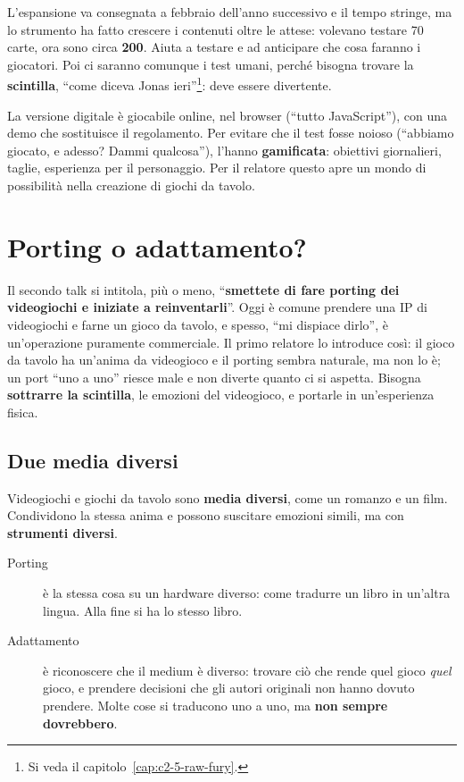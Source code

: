 L'espansione va consegnata a febbraio dell'anno successivo e il tempo stringe, ma
lo strumento ha fatto crescere i contenuti oltre le attese: volevano testare 70
carte, ora sono circa \textbf{200}. Aiuta a testare e ad anticipare che cosa faranno
i giocatori. Poi ci saranno comunque i test umani, perché bisogna trovare la
\textbf{scintilla}, ``come diceva Jonas ieri''\footnote{Si veda il
capitolo~\ref{cap:c2-5-raw-fury}.}: deve essere divertente.

La versione digitale è giocabile online, nel browser (``tutto JavaScript''), con una
demo che sostituisce il regolamento. Per evitare che il test fosse noioso
(``abbiamo giocato, e adesso? Dammi qualcosa''), l'hanno \textbf{gamificata}:
obiettivi giornalieri, taglie, esperienza per il personaggio. Per il relatore questo
apre un mondo di possibilità nella creazione di giochi da tavolo.

\section{Porting o adattamento?}
\label{sec:c3-5-porting}

Il secondo talk si intitola, più o meno, ``\textbf{smettete di fare porting dei
videogiochi e iniziate a reinventarli}''. Oggi è comune prendere una IP di
videogiochi e farne un gioco da tavolo, e spesso, ``mi dispiace dirlo'', è
un'operazione puramente commerciale. Il primo relatore lo introduce così: il gioco
da tavolo ha un'anima da videogioco e il porting sembra naturale, ma non lo è; un
port ``uno a uno'' riesce male e non diverte quanto ci si aspetta. Bisogna
\textbf{sottrarre la scintilla}, le emozioni del videogioco, e portarle in
un'esperienza fisica.

\subsection{Due media diversi}

Videogiochi e giochi da tavolo sono \textbf{media diversi}, come un romanzo e un
film. Condividono la stessa anima e possono suscitare emozioni simili, ma con
\textbf{strumenti diversi}.
\begin{description}
  \item[Porting] è la stessa cosa su un hardware diverso: come tradurre un libro in
        un'altra lingua. Alla fine si ha lo stesso libro.
  \item[Adattamento] è riconoscere che il medium è diverso: trovare ciò che rende
        quel gioco \emph{quel} gioco, e prendere decisioni che gli autori originali
        non hanno dovuto prendere. Molte cose si traducono uno a uno, ma
        \textbf{non sempre dovrebbero}.
\end{description}

